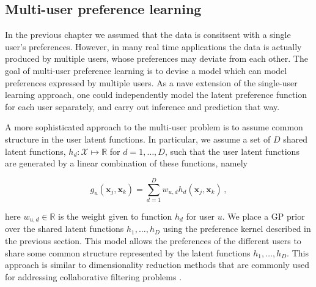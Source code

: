 
\subsection{Multi-user preference learning}

In the previous chapter we assumed that the data is consitsent with a single user's preferences. However, in many real time applications the data is actually produced by multiple users, whose preferences may deviate from each other. The goal of multi-user preference learning is to devise a model which can model preferences expressed by multiple users. As a nave extension of the single-user learning approach, one could independently model the latent preference function  for each user separately, and carry out inference and prediction that way. 

A more sophisticated approach to the multi-user problem is to assume common structure in the user latent functions. In particular, we assume a set of $D$ shared latent functions, $h_d:\mathcal{X} \mapsto \mathbb{R}$ for $d=1,\ldots,D$, such that the user latent functions are  generated by a linear combination of these functions, namely

\begin{equation}
	g_{u}(\mathbf{x}_j,\mathbf{x}_k)=\sum_{d=1}^{D}w_{u,d}h_{d}(\mathbf{x}_j,\mathbf{x}_k)\,,\label{eqn:preference_expressionG}
\end{equation}

here $w_{u,d}\in \mathbb{R}$ is the weight given to function $h_d$ for user $u$. We place a GP prior over the shared latent functions $h_{1},\ldots,h_{D}$ using the preference kernel described in the previous section. This model allows the preferences of the different users to share some common structure represented by the latent functions $h_{1},\ldots,h_{D}$. This approach is similar to dimensionality reduction methods that are commonly used for addressing collaborative filtering problems \citep{Stern2009,raiko2007}.

